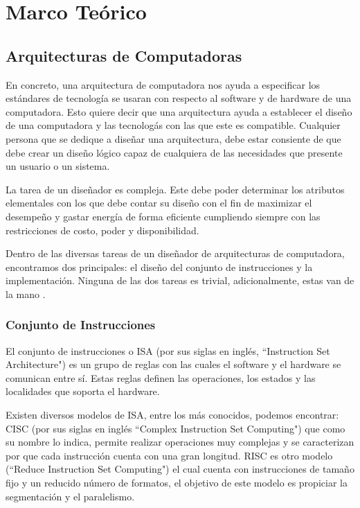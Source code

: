\chapter{Marco Te\'{o}rico}
\label{ch:marco}
\section{Arquitecturas de Computadoras}

En concreto, una arquitectura de computadora nos ayuda a especificar los est\'{a}ndares de tecnolog\'{i}a se usaran con respecto al software y de hardware de una computadora. Esto quiere decir que una arquitectura ayuda a establecer el dise\~no de una computadora y las tecnolog\'{a}s con las que este es compatible. Cualquier persona que se dedique a dise\~nar una arquitectura, debe estar consiente de que debe crear un dise\~no l\'{o}gico capaz de cualquiera de las necesidades que presente un usuario o un sistema.

La tarea de un dise\~nador es compleja. Este debe poder determinar los atributos elementales con los que debe contar su dise\~no con el fin de maximizar el desempe\~no y gastar energ\'{i}a de forma eficiente cumpliendo siempre con las restricciones de costo, poder y disponibilidad.

Dentro de las diversas tareas de un dise\~nador de arquitecturas de computadora, encontramos dos principales: el dise\~no del conjunto de instrucciones y la implementaci\'{o}n. Ninguna de las dos tareas es trivial, adicionalmente, estas van de la mano \cite{hennessy2011computer}. 

\subsection{Conjunto de Instrucciones}

El conjunto de instrucciones o ISA (por sus siglas en ingl\'{e}s, “Instruction Set Architecture") es un grupo de reglas con las cuales el software y el hardware se comunican entre s\'{i}. Estas reglas definen las operaciones, los estados y las localidades que soporta el hardware.

Existen diversos modelos de ISA, entre los m\'{a}s conocidos, podemos encontrar: CISC (por sus siglas en ingl\'{e}s “Complex Instruction Set Computing") que como su nombre lo indica, permite realizar operaciones muy complejas y se caracterizan por que cada instrucci\'{o}n cuenta con una gran longitud. RISC es otro modelo (“Reduce Instruction Set Computing") el cual cuenta con instrucciones de tama\~no fijo y un reducido n\'{u}mero de formatos, el objetivo de este modelo es propiciar la segmentaci\'{o}n y el paralelismo.


